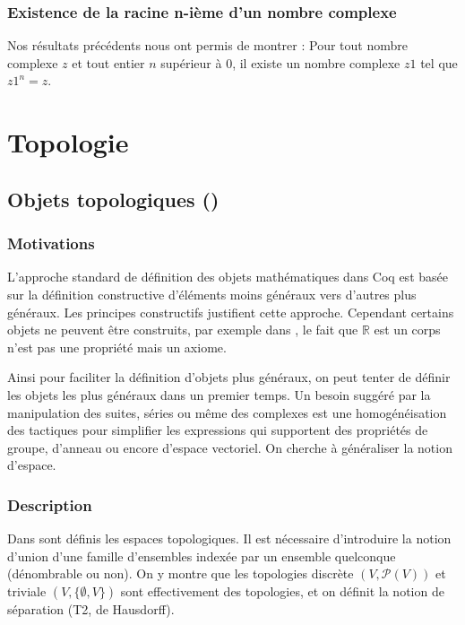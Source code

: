 \subsubsection{Existence de la racine n-ième d'un nombre complexe}
Nos résultats précédents nous ont permis de montrer :
Pour tout nombre complexe $z$ et tout entier $n$ supérieur à $0$, il existe un nombre complexe $z1$ tel que $z1 ^ n = z$.

\section{Topologie}

\subsection{Objets topologiques ()}

\subsubsection{Motivations}

L'approche standard de définition des objets mathématiques dans Coq est basée sur la définition constructive d'éléments moins généraux vers d'autres plus généraux. Les principes constructifs justifient cette approche. Cependant certains objets ne peuvent être construits, par exemple dans , le fait que $\mathbb{R}$ est un corps n'est pas une propriété mais un axiome.

Ainsi pour faciliter la définition d'objets plus généraux, on peut tenter de définir les objets les plus généraux dans un premier temps. Un besoin suggéré par la manipulation des suites, séries ou même des complexes est une homogénéisation des tactiques pour simplifier les expressions qui supportent des propriétés de groupe, d'anneau ou encore d'espace vectoriel. On cherche à généraliser la notion d'espace.

\subsubsection{Description}

Dans  sont définis les espaces topologiques. Il est nécessaire d'introduire la notion d'union d'une famille d'ensembles indexée par un ensemble quelconque (dénombrable ou non). On y montre que les topologies discrète $(V,\mathcal{P}(V))$ et triviale $(V,\{\emptyset,V\})$ sont effectivement des topologies, et on définit la notion de séparation (T2, de Hausdorff).


